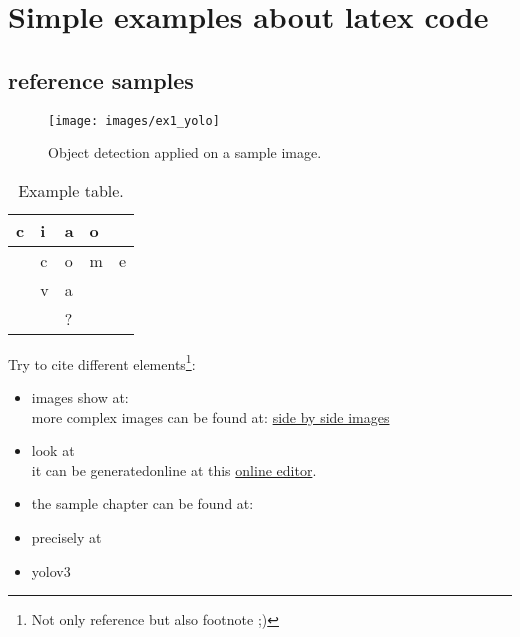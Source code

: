 \chapter*{Simple examples about latex code}
\label{cha:samples}

\section{reference samples}
\label{sec:refSamples}

\begin{figure}[!h]
	\centering
	\texttt{[image: images/ex1\_yolo]} %
	\caption{Object detection applied on a sample image.}
	\label{fig:sampleYolo}
\end{figure}

\begin{table}[h]
	\centering
	\begin{tabular}{ll|l|ll}
		\cline{1-4}
		\multicolumn{1}{|l|}{c} & i & a & \multicolumn{1}{l|}{o} &                        \\ \hline
		\multicolumn{1}{l|}{}   & c & o & \multicolumn{1}{l|}{m} & \multicolumn{1}{l|}{e} \\ \cline{2-5} 
		\multicolumn{1}{l|}{}   & v & a &                        &                        \\ \cline{2-3}
		&   & ? &                        &                        \\ \cline{3-3}
	\end{tabular}
	\caption{Example table.}
	\label{tab:sampleTable}
\end{table}

Try to cite different elements\footnote{Not only reference but also footnote ;)}:
\begin{itemize}
	\item images show at: \\
		  more complex images can be found at: \href{https://tex.stackexchange.com/questions/37581/latex-figures-side-by-side}{side by side images}
	\item look at \\
	it can be generatedonline at this \href{https://www.tablesgenerator.com/}{online editor}.
	\item the sample chapter can be found at: 
	\item precisely at 
	\item yolov3 \cite{yoloV3}
\end{itemize}

